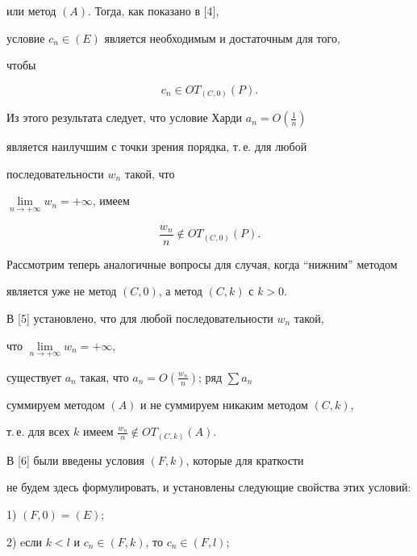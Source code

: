 или метод $(A)$. Тогда, как показано в [4],


условие ${c_n} \in (E)$ является необходимым и достаточным для того, 


чтобы


$$


{c_n} \in OT_{(C, 0)} (P).


$$





Из этого результата следует, что условие Харди $a_n=O (\frac{1}{n})$ 


является наилучшим с точки зрения порядка, т.\,е. для любой 


последовательности ${w_n}$ такой, что 


$\lim\limits_{n \to+\infty} w_n=+\infty$, имеем


$$


{\frac{w_n}{n}} \notin OT_{(C, 0)} (P).


$$





Рассмотрим теперь аналогичные вопросы для случая, когда ``нижним'' методом 


является уже не метод $(C, 0)$, а метод $(C, k)$ с $k>0$.





В [5] установлено, что для любой последовательности $w_n$ такой, 


что $\lim\limits_{n \to+\infty} w_n=+\infty$,


существует $a_n$ такая, что $a_n=O(\frac{w_n}{n})$; ряд $\sum a_n$ 


суммируем методом $(A)$ и не суммируем никаким методом $(C, k)$, 


т.\,е. для всех $k$ имеем $\frac{w_n}{n} \notin OT_{(C, k)}(A)$.





В [6] были введены условия $(F, k)$, которые для краткости 


не будем здесь формулировать, и установлены следующие свойства этих условий:





1) $(F, 0)=(E)$;





2) eсли $k<l$ и $c_n\in(F,k)$, то $c_n\in(F,l)$;





